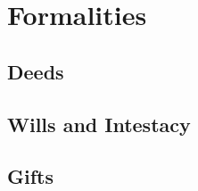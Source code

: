 \chapter{Formalities}



\section{Deeds}





\begin{questions}

\end{questions}



\begin{questions}

\end{questions}





\section{Wills and Intestacy}











\begin{questions}

\end{questions}



\begin{questions}

\end{questions}




\section{Gifts}

                                     
                                                              
                                    
                                                              
\begin{questions}                                             
                                 
\end{questions}                                               

